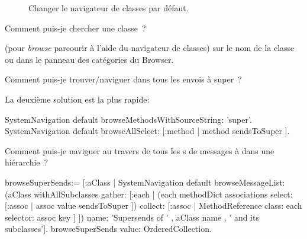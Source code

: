 \documentclass[a4paper,10pt,twoside]{book}
\begin{document}
\begin{figure}[tbh]
	\centering
	\hfill
	\hfill
	\caption{Changer le navigateur de classes par défaut.}
\end{figure}

\begin{faq}
Comment puis-je chercher une classe~?
\end{faq}
\answer
 (pour \emph{browse} \cad parcourir à l'aide du navigateur
de classes) sur le nom de la classe ou  dans le panneau des
catégories du Browser. %

\begin{faq}
Comment puis-je trouver/naviguer dans tous les envois 
à
 super~?
\end{faq}
\answer
La deuxième solution est la plus rapide:
\begin{code}{}
SystemNavigation default browseMethodsWithSourceString: 'super'.
SystemNavigation default browseAllSelect: [:method | method sendsToSuper ].
\end{code}

\begin{faq}
Comment puis-je naviguer au travers de tous les 
s de messages à  dans une hiérarchie~?
\end{faq}
\answer
\begin{code}{}
browseSuperSends:= [:aClass | SystemNavigation default
	browseMessageList: (aClass withAllSubclasses gather: [:each |
		(each methodDict associations
			select: [:assoc | assoc value sendsToSuper ])
				collect: [:assoc | MethodReference class: each selector: assoc key ] ])
	name: 'Supersends of ' , aClass name , ' and its subclasses'].
browseSuperSends value: OrderedCollection.
\end{code}
\end{document}
